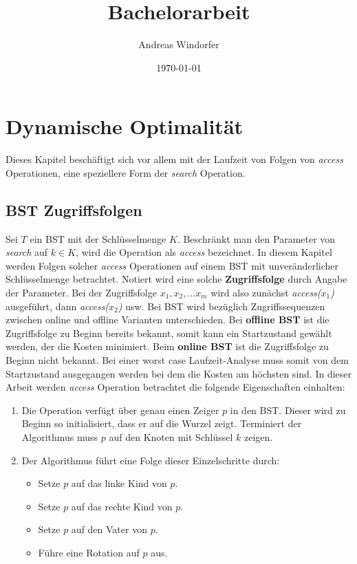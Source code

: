 \documentclass[a4paper,12pt]{article}
\title{Bachelorarbeit}
\author{
Andreas Windorfer\\
}
\date{\today}
\begin{document}
\maketitle
 \newpage

\tableofcontents
\newpage

\section{Dynamische Optimalität}
Dieses Kapitel beschäftigt sich vor allem mit der Laufzeit von Folgen von \textit{access} Operationen, eine speziellere Form der \textit{search} Operation.  
\subsection{BST Zugriffsfolgen}
Sei $T$ ein BST mit der Schlüsselmenge $K$. Beschränkt man den Parameter von \textit{search} auf $k \in K $, wird  die Operation als \textit{access} bezeichnet. In diesem Kapitel werden Folgen solcher \textit{access} Operationen auf einem BST mit unveränderlicher Schlüsselmenge betrachtet. Notiert wird eine solche \textbf{Zugriffsfolge} durch Angabe der Parameter. Bei der Zugriffsfolge $x_1,x_2,...x_m$ wird also zunächst \textit{access($x_1$)} ausgeführt, dann \textit{access($x_2$)} usw.  Bei BST wird bezüglich Zugriffssequenzen zwischen online und offline Varianten unterschieden. Bei \textbf{offline BST} ist die Zugriffsfolge zu Beginn bereits bekannt, somit kann ein Startzustand gewählt werden, der die Kosten minimiert. Beim \textbf{online BST} ist die Zugriffsfolge zu Beginn nicht bekannt. Bei einer worst case Laufzeit-Analyse muss somit von dem Startzustand ausgegangen werden bei dem die Kosten am höchsten sind.
In dieser Arbeit werden \textit{access} Operation betrachtet die folgende Eigenschaften einhalten:

\begin{enumerate} 
	\item Die Operation verfügt über genau einen Zeiger $p$ in den BST. Dieser wird zu Beginn so initialisiert, dass er auf die Wurzel zeigt. Terminiert der Algorithmus muss $p$ auf den Knoten mit Schlüssel $k$ zeigen.
	\item Der Algorithmus führt eine Folge dieser Einzelschritte durch:
	\begin{itemize}
		\item Setze $p$ auf das linke Kind von $p$.
		\item Setze $p$ auf das rechte Kind von $p$.
		\item Setze $p$ auf den Vater von $p$.
		\item Führe eine Rotation auf $p$ aus.
	\end{itemize}  
	
\end{enumerate}
\end{document}
